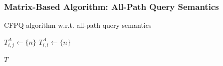 \documentclass[xcolor=table]{beamer}
\begin{document}
  \begin{frame}[fragile] \frametitle{Matrix-Based Algorithm: All-Path Query Semantics}
\begin{algorithm}[H]
	\begin{algorithmic}[1]
		\caption{CFPQ algorithm w.r.t. all-path query semantics}
		\label{lst:algo2}
		{$T^{A}_{i,j} \gets \{n\}$}
		\EndFor
		{$T^{A}_{i,i} \gets \{n\}$}
		\EndFor
		
		\EndFor
		\EndWhile
		\State \Return $T$
		\EndFunction
	\end{algorithmic}
\end{algorithm}
\end{frame}



%  	
%  	
\end{document}
